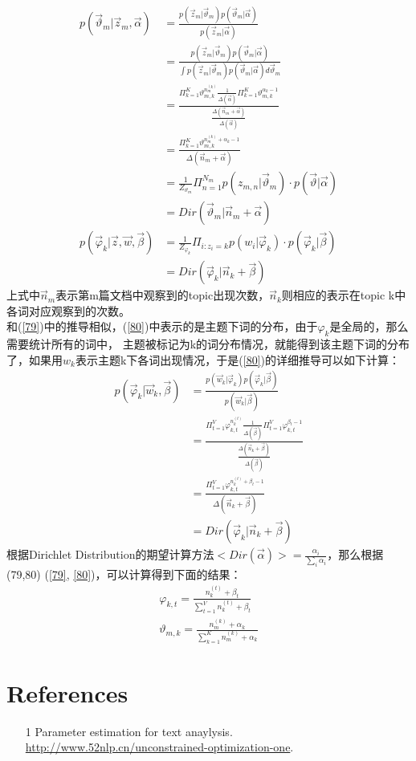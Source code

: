 \documentclass[UTF8]{ctexart}
\begin{document}
\begin{align}
\label{79}
p(\vec{\vartheta}_m|\vec{z}_m,\vec{\alpha}) &=
\frac{p(\vec{z}_m|\vec{\vartheta}_m)p(\vec{\vartheta}_m|\vec{\alpha})}{p(\vec{z}_m|\vec{\alpha})}
\\
&= \frac{p(\vec{z}_m|\vec{\vartheta}_m)p(\vec{\vartheta}_m|\vec{\alpha})}
{\int p(\vec{z}_m|\vec{\vartheta}_m)p(\vec{\vartheta}_m|\vec{\alpha}) d\vec{\vartheta}_m}
\\
&= \frac{\Pi_{k=1}^K \vartheta_{m,k}^{n_m^{(k)}} \frac{1}
{\Delta(\vec{\alpha})} \Pi_{k=1}^K \vartheta_{m,k}^{\alpha_k - 1} }
{\frac{\Delta(\vec{n}_m + \vec{\alpha})}{\Delta(\vec{\alpha})}}
\\
&= \frac{\Pi_{k=1}^K \vartheta_{m,k}^{n_m^{(k)} + \alpha_k - 1}}{\Delta(\vec{n}_m + \vec{\alpha})}
\\
&= \frac{1}{Z_{\vartheta _m}} \Pi_{n=1}^{N_m}
p(z_{m,n}|\vec{\vartheta}_m) \cdot p(\vec{\vartheta}|\vec{\alpha}) 
\\
&= Dir(\vec{\vartheta}_m|\vec{n}_m+\vec{\alpha})
\\
\label{80}
p(\vec{\varphi}_k|\vec{z},\vec{w}, \vec{\beta}) &= \frac{1}{Z_{\varphi_k}} \Pi_{i:z_i=k}
p(w_i|\vec{\varphi}_k) \cdot p(\vec{\varphi}_k|\vec{\beta}) 
\\
&= Dir(\vec{\varphi}_k | \vec{n}_k + \vec{\beta})
\end{align}
上式中$\vec{n}_m$表示第m篇文档中观察到的topic出现次数，$\vec{n}_k$则相应的表示在topic k中各词对应观察到的次数。\\
和(\ref{79})中的推导相似，(\ref{80})中表示的是主题下词的分布，由于$\varphi_k$是全局的，那么需要统计所有的词中，
主题被标记为k的词分布情况，就能得到该主题下词的分布了，如果用$w_k$表示主题k下各词出现情况，于是(\ref{80})的详细推导可以如下计算：
\begin{align}
p(\vec{\varphi}_k|\vec{w}_k, \vec{\beta}) &= 
\frac{p(\vec{w}_k|\vec{\varphi}_k)p(\vec{\varphi}_k|\vec{\beta})}{p(\vec{w}_k|\vec{\beta})}
\\ &=
\frac{\Pi_{t=1}^V \varphi_{k,t}^{n_k^{(t)}} \frac{1}{\Delta(\vec{\beta})} \Pi_{t=1}^V \varphi_{k,t}^{\beta_t -1}}
{\frac{\Delta(\vec{n}_k + \vec{\beta})}{\Delta(\vec{\beta})}}
\\
&= \frac{\Pi_{t=1}^V \varphi_{k,t}^{n_k^{(t)} + \beta_t -1}}{\Delta(\vec{n}_k+\vec{\beta})}
\\
&= Dir(\vec{\varphi}_k|\vec{n}_k+\vec{\beta})
\end{align}
根据Dirichlet Distribution的期望计算方法$<Dir(\vec{\alpha})> = \frac{\alpha_i}{\sum_i \alpha_i}$，那么根据(79,80)
(\ref{79}, \ref{80})，可以计算得到下面的结果：
\begin{align}
\label{81}
\varphi_{k,t} = \frac{n_k^{(t)}+\beta_t}{\sum_{t=1}^V n_k^{(t)}+\beta_t}
\\
\label{82}
\vartheta_{m,k} = \frac{n_m^{(k)}+\alpha_k}{\sum_{k=1}^K n_m^{(k)}+\alpha_k}
\end{align}


\section{References}
\begin{itemize}
\item[1] Parameter estimation for text anaylysis.\\
\url{http://www.52nlp.cn/unconstrained-optimization-one}.
\end{itemize}
\end{document}
